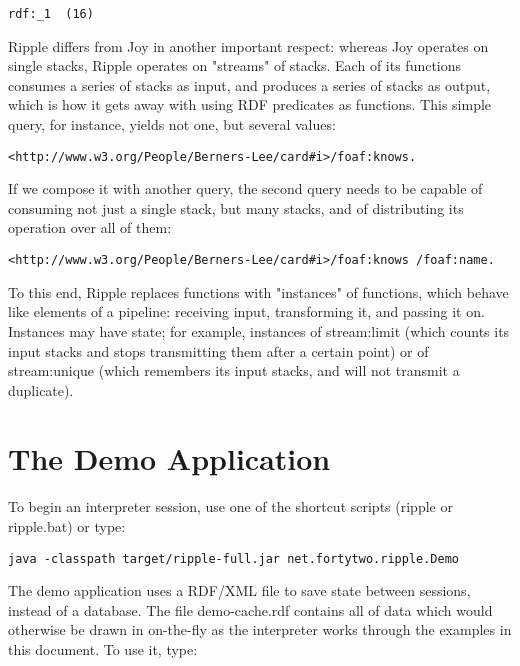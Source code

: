\documentclass[runningheads]{llncs}
\begin{document}
\begin{verbatim}
rdf:_1  (16)
\end{verbatim}







Ripple differs from Joy in another important respect: whereas Joy operates on single stacks, Ripple operates on "streams" of stacks.  Each of its functions consumes a series of stacks as input, and produces a series of stacks as output, which is how it gets away with using RDF predicates as functions.  This simple query, for instance, yields not one, but several values:

\begin{verbatim}
<http://www.w3.org/People/Berners-Lee/card#i>/foaf:knows.
\end{verbatim}

If we compose it with another query, the second query needs to be capable of consuming not just a single stack, but many stacks, and of distributing its operation over all of them:

\begin{verbatim}
<http://www.w3.org/People/Berners-Lee/card#i>/foaf:knows /foaf:name.
\end{verbatim}

To this end, Ripple replaces functions with "instances" of functions, which behave like elements of a pipeline: receiving input, transforming it, and passing it on.  Instances may have state; for example, instances of stream:limit (which counts its input stacks and stops transmitting them after a certain point) or of stream:unique (which remembers its input stacks, and will not transmit a duplicate).

\section{The Demo Application}

To begin an interpreter session, use one of the shortcut scripts (ripple or ripple.bat) or type:

\begin{verbatim}
java -classpath target/ripple-full.jar net.fortytwo.ripple.Demo
\end{verbatim}

The demo application uses a RDF/XML file to save state between sessions, instead of a database.  The file demo-cache.rdf contains all of data which would otherwise be drawn in on-the-fly as the interpreter works through the examples in this document.  To use it, type:
\end{document}
